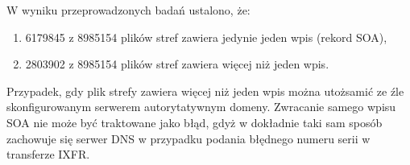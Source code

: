 W wyniku przeprowadzonych badań ustalono, że:
\begin{enumerate}
	\item 6179845 z 8985154 plików stref zawiera jedynie jeden wpis (rekord SOA),
	\item 2803902 z 8985154 plików stref zawiera więcej niż jeden wpis.
\end{enumerate}
Przypadek, gdy plik strefy zawiera więcej niż jeden wpis można utożsamić ze źle skonfigurowanym serwerem autorytatywnym domeny. Zwracanie samego wpisu SOA nie może być traktowane jako błąd, gdyż w dokładnie taki sam sposób zachowuje się serwer DNS w przypadku podania błędnego numeru serii w transferze IXFR. 

